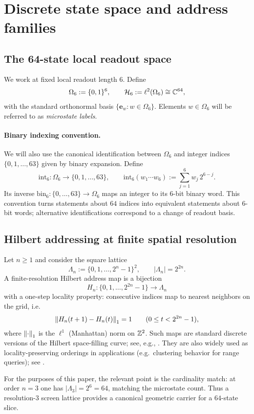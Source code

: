 
\section{Discrete state space and address families}
\label{sec:state_space_addressing}

\subsection{The 64-state local readout space}
We work at fixed local readout length $6$.
Define
\[
\Omega_6:=\{0,1\}^6,
\qquad \mathcal{H}_6:=\ell^2(\Omega_6)\cong \mathbb{C}^{64},
\]
with the standard orthonormal basis $\{\mathbf{e}_w:w\in\Omega_6\}$.
Elements $w\in\Omega_6$ will be referred to as \emph{microstate labels}.

\paragraph{Binary indexing convention.}
We will also use the canonical identification between $\Omega_6$ and integer indices $\{0,1,\dots,63\}$ given by binary expansion.
Define
\[
\mathrm{int}_6:\Omega_6\to \{0,1,\dots,63\},
\qquad
\mathrm{int}_6(w_1\cdots w_6):=\sum_{j=1}^6 w_j\,2^{6-j}.
\]
Its inverse $\mathrm{bin}_6:\{0,\dots,63\}\to\Omega_6$ maps an integer to its $6$-bit binary word.
This convention turns statements about $64$ indices into equivalent statements about $6$-bit words; alternative identifications correspond to a change of readout basis.

\subsection{Hilbert addressing at finite spatial resolution}
Let $n\ge 1$ and consider the square lattice
\[
\Lambda_n:=\{0,1,\dots,2^n-1\}^2,
\qquad |\Lambda_n|=2^{2n}.
\]
A finite-resolution Hilbert address map is a bijection
\[
H_n:\{0,1,\dots,2^{2n}-1\}\to \Lambda_n
\]
with a one-step locality property: consecutive indices map to nearest neighbors on the grid, i.e.
\[
\left\lVert H_n(t+1)-H_n(t)\right\rVert_1=1
\qquad (0\le t<2^{2n}-1),
\]
where $\left\lVert \cdot\right\rVert_1$ is the $\ell^1$ (Manhattan) norm on $\mathbb{Z}^2$.
Such maps are standard discrete versions of the Hilbert space-filling curve; see, e.g., \cite{Hilbert1891,Sagan1994}.
They are also widely used as locality-preserving orderings in applications (e.g.\ clustering behavior for range queries); see \cite{MoonJagadishFaloutsosSaltz2001}.

For the purposes of this paper, the relevant point is the cardinality match: at order $n=3$ one has $|\Lambda_3|=2^6=64$, matching the microstate count.
Thus a resolution-$3$ screen lattice provides a canonical geometric carrier for a $64$-state slice.

